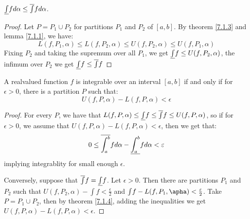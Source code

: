 \begin{theorem}\label{7.1.4}
    $\underline{\int}{f}d\alpha \leq \overline{\int}{f}d\alpha$.
\end{theorem}
\begin{proof}
    Let $P=P_1 \cup P_2$ for partitions $P_1$ and $P_2$ of $[a,b]$. By theorem
    \ref{7.1.3} and lemma  \ref{7.1.1}, we have:
        \begin{equation}
            L(f,P_1,\alpha) \leq L(f,P_2,\alpha) \leq U(f,P_2, \alpha) \leq
            U(f,P_1, \alpha)
        \end{equation}
        Fixing $P_2$ and taking the supremum over all $P_1$, we get
        $\underline{\int}{f} \leq U(f,P_2,\alpha)$, the infimum over $P_2$ we
        get $\underline{\int}{f} \leq \overline{\int}{f}$
\end{proof}

\begin{theorem}\label{7.1.5}
    A realvalued function $f$ is integrable over an interval  $[a,b]$ if and
    only if for $\epsilon>0$, there is a partition $P$ such that:
        \begin{equation}
            U(f,P,\alpha)-L(f,P,\alpha)<\epsilon
        \end{equation}
\end{theorem}
\begin{proof}
    For every $P$, we have that  $L(f,P,\alpha) \leq \underline{\int}{f} \leq
    \overline{\int}{f} \leq U(f,P,\alpha)$, so if  for $\epsilon>0$, we assume that
    $U(f,P,\alpha)-L(f,P,\alpha)<\epsilon$, then we get that:
        \begin{equation}
            0 \leq
            \overline{\int_{a}^{b}}{f}d\alpha-\underline{\int_{a}^{b}}{f}d\alpha<\varepsilon
        \end{equation}
    implying integrablity for small enough $\epsilon$.

    Conversely, suppose that $\overline{\int}{f}=\underline{\int}{f}$. Let  $\epsilon>0$.
    Then there are partitions  $P_1$ and $P_2$ such that
    $U(f,P_2,\alpha)-{\int}{f}<\frac{\epsilon}{2}$ and
    ${\int}{f}-L(f,P_1,\apha)<\frac{\epsilon}{2}$. Take $P=P_1 \cup P_2$, then
    by theorem \ref{7.1.4}, adding the inequalities we get
    $U(f,P,\alpha)-L(f,P,\alpha)<\epsilon$.
\end{proof}

